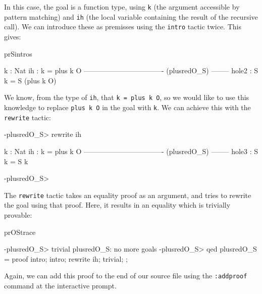 \noindent
In this case, the goal is a function type, using \texttt{k} (the argument accessible by
pattern matching) and \texttt{ih} (the local variable containing the result of
the recursive call). We can introduce these as premisses using the \texttt{intro} tactic
twice. This gives:

\begin{SaveVerbatim}{prSintros}

  k : Nat
  ih : k = plus k O
---------------------------------- (plusredO_S) --------
{hole2} : S k = S (plus k O)

\end{SaveVerbatim}

\noindent
We know, from the type of \texttt{ih}, that \texttt{k = plus k O}, so we would like to
use this knowledge to replace \texttt{plus k O} in the goal with \texttt{k}. We can
achieve this with the \texttt{rewrite} tactic:

\begin{SaveVerbatim}{}

-plusredO_S> rewrite ih 

  k : Nat
  ih : k = plus k O
---------------------------------- (plusredO_S) --------
{hole3} : S k = S k

-plusredO_S>  

\end{SaveVerbatim}
\useverb{}

\noindent
The \texttt{rewrite} tactic takes an equality proof as an argument, and tries to rewrite
the goal using that proof. Here, it results in an equality which is trivially provable:

\begin{SaveVerbatim}{prOStrace}

-plusredO_S> trivial 
plusredO_S: no more goals
-plusredO_S> qed 
plusredO_S = proof {
    intro;
    intro;
    rewrite ih;
    trivial;
};

\end{SaveVerbatim}

\noindent
Again, we can add this proof to the end of our source file using the \texttt{:addproof}
command at the interactive prompt.
